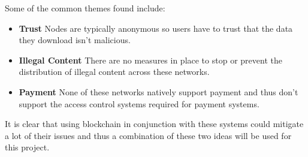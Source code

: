 \noindent
Some of the common themes found include:

\begin{itemize}
  \item \textbf{Trust} Nodes are typically anonymous so users have to trust that the data they download isn't malicious.
  \item \textbf{Illegal Content} There are no measures in place to stop or prevent the distribution of illegal content across these networks.
  \item \textbf{Payment} None of these networks natively support payment and thus don't support the access control systems required for payment systems.
\end{itemize}

\newparagraph
It is clear that using blockchain in conjunction with these systems could mitigate a lot of their issues and thus a combination of these two ideas will be used for this project.